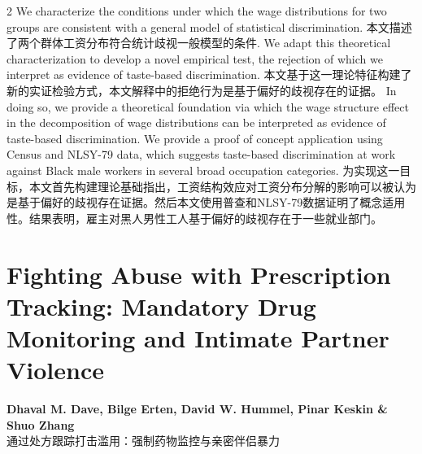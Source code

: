 \documentclass[cn,hazy,blue,14pt,screen]{elegantnote}
\begin{document}
\begin{paracol}{2}
	We characterize the conditions under which the wage distributions for two groups are consistent with a general model of statistical discrimination. 
	\switchcolumn
	本文描述了两个群体工资分布符合统计歧视一般模型的条件.
	\switchcolumn*
	We adapt this theoretical characterization to develop a novel empirical test, the rejection of which we interpret as evidence of taste-based discrimination. 
	\switchcolumn
	本文基于这一理论特征构建了新的实证检验方式，本文解释中的拒绝行为是基于偏好的歧视存在的证据。
	\switchcolumn*
	In doing so, we provide a theoretical foundation via which the wage structure effect in the decomposition of wage distributions can be interpreted as evidence of taste-based discrimination. We provide a proof of concept application using Census and NLSY-79 data, which suggests taste-based discrimination at work against Black male workers in several broad occupation categories.
	为实现这一目标，本文首先构建理论基础指出，工资结构效应对工资分布分解的影响可以被认为是基于偏好的歧视存在证据。然后本文使用普查和NLSY-79数据证明了概念适用性。结果表明，雇主对黑人男性工人基于偏好的歧视存在于一些就业部门。
	
\end{paracol}

\section{Fighting Abuse with Prescription Tracking: Mandatory Drug Monitoring and Intimate Partner Violence}
\begin{center}
	\textbf{Dhaval M. Dave, Bilge Erten, David W. Hummel, Pinar Keskin \& Shuo Zhang}\\
	通过处方跟踪打击滥用：强制药物监控与亲密伴侣暴力
\end{center}
\end{document}
